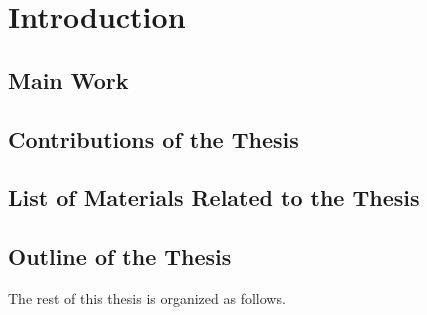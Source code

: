 
\chapter{Introduction} \label{Chapter1}

\section{Main Work}

\section{Contributions of the Thesis}

\section{List of Materials Related to the Thesis}

\section{Outline of the Thesis}

The rest of this thesis is organized as follows.
